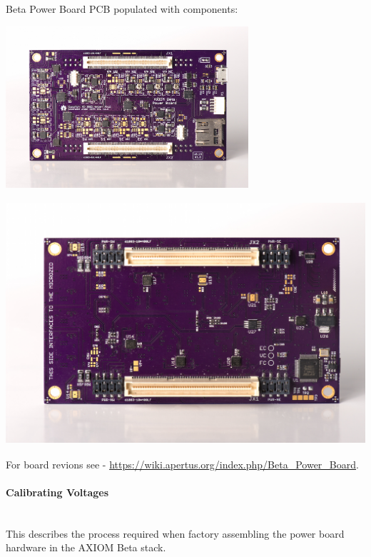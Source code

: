 Beta Power Board PCB populated with components:\\

\begin{center}
\includegraphics[height=6cm]{images/BetaPowerBoard_0.18_TOP}
\end{center}

\begin{center}
\includegraphics[height=9cm]{images/BetaPowerBoard_0.18_BOTTOM}
\end{center}

For board revions see - \href{https://wiki.apertus.org/index.php/Beta_Power_Board}{https://wiki.apertus.org/index.php/Beta\_Power\_Board}.\\


\paragraph{Calibrating Voltages}\mbox{}\\

This describes the process required when factory assembling the power board hardware in the AXIOM Beta stack.\\

